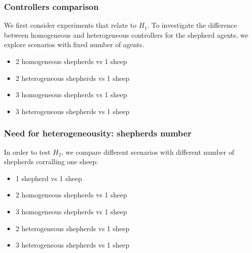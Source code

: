 \documentclass[conference]{IEEEtran}
\begin{document}
\subsubsection{Controllers comparison}
We first consider experiments that relate to $H_1$. To investigate the difference between homogeneous and heterogeneous controllers for the shepherd agents, we explore scenarios with fixed number of agents. 
\begin{itemize}
	\item 2 homogeneous shepherds vs 1 sheep
	\item 2 heterogeneous shepherds vs 1 sheep
	\item 3 homogeneous shepherds vs 1 sheep
	\item 3 heterogeneous shepherds vs 1 sheep
\end{itemize}

\vspace{0.5em}
\subsubsection{Need for heterogeneousity: shepherds number}
In order to test $H_2$, we compare different scenarios with different number of shepherds corralling one sheep:
\begin{itemize}
	\item 1 shepherd vs 1 sheep	
	\item 2 homogeneous shepherds vs 1 sheep
	\item 3 homogeneous shepherds vs 1 sheep
	\item 2 heterogeneous shepherds vs 1 sheep
	\item 3 heterogeneous shepherds vs 1 sheep
	
\end{itemize}

\vspace{0.5em}
\end{document}
